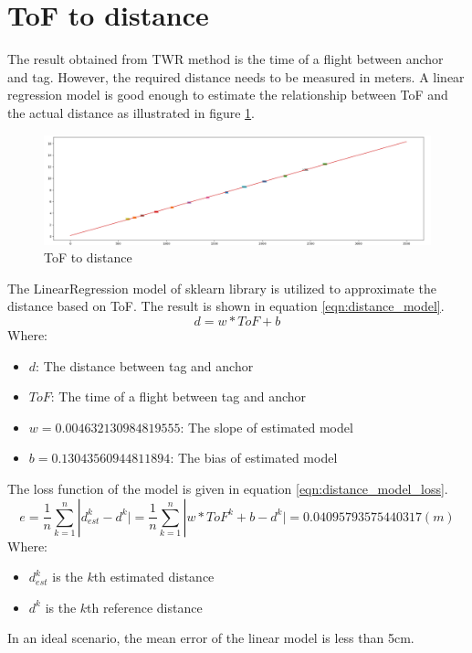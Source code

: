 \documentclass[\main/main.tex]{subfiles}
\begin{document}
\section{ToF to distance}
The result obtained from TWR method is the time of a flight between anchor and tag. However, the required distance needs to be measured in meters. A linear regression model is good enough to estimate the relationship between ToF and the actual distance as illustrated in figure \ref{fig:tof_to_distance}.
\begin{figure}[H]
    \begin{center}
        \includegraphics[width=1\textwidth]{tof_to_distance.png}
    \end{center}
    \caption{ToF to distance}
    \label{fig:tof_to_distance}
\end{figure}
The LinearRegression model of sklearn library is utilized to approximate the distance based on ToF. The result is shown in equation \ref{eqn:distance_model}.
\begin{equation}
    d = w*ToF + b
    \label{eqn:distance_model}
\end{equation}
Where:
\begin{itemize}
    \item $d$: The distance between tag and anchor
    \item $ToF$: The time of a flight between tag and anchor
    \item $w = 0.004632130984819555$: The slope of estimated model 
    \item $b = 0.13043560944811894$: The bias of estimated model
\end{itemize}

The loss function of the model is given in equation \ref{eqn:distance_model_loss}.
\begin{equation}
    e = \frac{1}{n} \sum_{k = 1}^{n} | d^k_{est}-d^k \vert = \frac{1}{n} \sum_{k = 1}^{n} | w*ToF^k + b -d^k \vert  = 0.04095793575440317 (m)
    \label{eqn:distance_model_loss}
\end{equation}
Where:
\begin{itemize}
    \item $d^k_{est}$ is the $k$th estimated distance
    \item $d^k$ is the $k$th reference distance
\end{itemize}

In an ideal scenario, the mean error of the linear model is less than 5cm.
\end{document}
